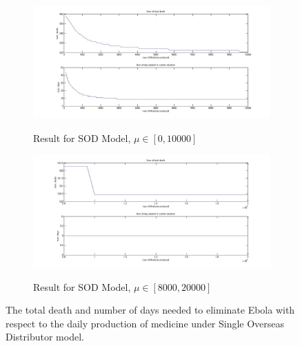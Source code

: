 \documentclass[12pt,a4paper,titlepage]{article}
\begin{document}
\begin{figure}[htbp]
  	\centering
  	\begin{subfigure}[b]{1\textwidth}
      	\includegraphics[width=\textwidth]{figures/imgSingleShort.jpg}
      	\label{figure_singleModel_short}
      	\caption{Result for SOD Model, $\mu \in [0, 10000]$}
  	\end{subfigure}
  	\begin{subfigure}[b]{1\textwidth}
      	\includegraphics[width=\textwidth]{figures/imgSingleLong.jpg}
   		 \label{figure_singleModel_long}
   		 \caption{Result for SOD Model, $\mu \in [8000, 20000]$}
  	\end{subfigure}
  	\caption{The total death and number of days needed to eliminate Ebola with respect to the daily production of medicine under Single Overseas Distributor model.}
  	\label{figure_singleModel}
\end{figure}
\end{document}
